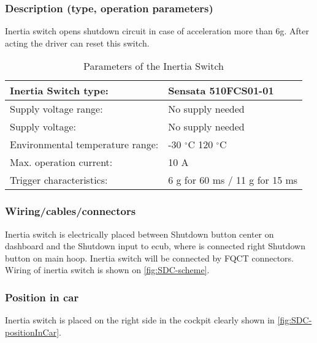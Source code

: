 \subsubsection{Description (type, operation parameters)}
\iffalse Describe the Inertia Switch used and use a table for the common operation parameters, like supply voltage, temperature, etc.
Additionally, fill out the following table replacing the values with your specification: \fi

Inertia switch opens shutdown circuit in case of acceleration more than 6g. After acting the driver can reset this switch.
\begin{table}[H]
	\centering
	\caption{Parameters of the Inertia Switch}
	\begin{tabularx}{\textwidth}{|X|l|}
	\hline	Inertia Switch type: & Sensata 510FCS01-01 \\[\TableSize]
	\hline	Supply voltage range: & No supply needed \\[\TableSize]
	\hline	Supply voltage: & No supply needed \\[\TableSize]
	\hline	Environmental temperature range: & -30 $^\circ$C 120 $^\circ$C \\[\TableSize]
	\hline	Max. operation current: & 10 A \\[\TableSize]
	\hline	Trigger characteristics: & 6 g for 60 ms / 11 g for 15 ms \\[\TableSize]
	\hline
	\end{tabularx}%
	\label{tab:inertiaSwitch}%
\end{table}%


\subsubsection{Wiring/cables/connectors}

Inertia switch is electrically placed between Shutdown button center on dashboard and the Shutdown input to \gls{ecub}, where is connected right Shutdown button on main hoop. Inertia switch will be connected by FQCT connectors. Wiring of inertia switch is shown on \ref{fig:SDC-scheme}.

\subsubsection{Position in car}

Inertia switch is placed on the right side in the cockpit clearly shown in \ref{fig:SDC-positionInCar}.